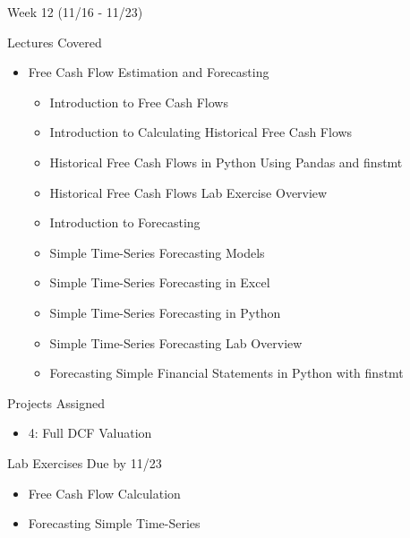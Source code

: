 \documentclass[]{article}
\begin{document}
\begin{section}{Week 12 (11/16 - 11/23)}
\begin{subsection}{Lectures Covered}
\begin{itemize}
\item Free Cash Flow Estimation and Forecasting
\begin{itemize}
\item Introduction to Free Cash Flows
\item Introduction to Calculating Historical Free Cash Flows
\item Historical Free Cash Flows in Python Using Pandas and finstmt
\item Historical Free Cash Flows Lab Exercise Overview
\item Introduction to Forecasting
\item Simple Time-Series Forecasting Models
\item Simple Time-Series Forecasting in Excel
\item Simple Time-Series Forecasting in Python
\item Simple Time-Series Forecasting Lab Overview
\item Forecasting Simple Financial Statements in Python with finstmt
\end{itemize}
\end{itemize}
\end{subsection}
\begin{subsection}{Projects Assigned}
\begin{itemize}
\item 4: Full DCF Valuation
\end{itemize}
\end{subsection}
\begin{subsection}{Lab Exercises Due by 11/23}
\begin{itemize}
\item Free Cash Flow Calculation
\item Forecasting Simple Time-Series
\end{itemize}
\end{subsection}
\end{section}
\end{document}
